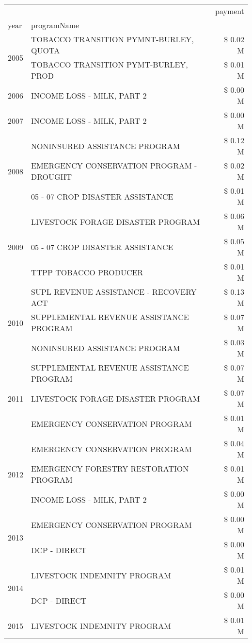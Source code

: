 \begin{tabular}{llr}
\toprule
 &  & payment \\
year & programName &  \\
\midrule
\multirow[t]{2}{*}{2005} & TOBACCO TRANSITION PYMNT-BURLEY, QUOTA & \$ 0.02 M \\
 & TOBACCO TRANSITION PYMT-BURLEY, PROD & \$ 0.01 M \\
\cline{1-3}
2006 & INCOME LOSS - MILK, PART 2 & \$ 0.00 M \\
\cline{1-3}
2007 & INCOME LOSS - MILK, PART 2 & \$ 0.00 M \\
\cline{1-3}
\multirow[t]{3}{*}{2008} & NONINSURED ASSISTANCE PROGRAM & \$ 0.12 M \\
 & EMERGENCY CONSERVATION PROGRAM - DROUGHT & \$ 0.02 M \\
 & 05 - 07 CROP DISASTER ASSISTANCE & \$ 0.01 M \\
\cline{1-3}
\multirow[t]{3}{*}{2009} & LIVESTOCK FORAGE DISASTER  PROGRAM & \$ 0.06 M \\
 & 05 - 07 CROP DISASTER ASSISTANCE & \$ 0.05 M \\
 & TTPP TOBACCO PRODUCER & \$ 0.01 M \\
\cline{1-3}
\multirow[t]{3}{*}{2010} & SUPL REVENUE ASSISTANCE - RECOVERY ACT & \$ 0.13 M \\
 & SUPPLEMENTAL REVENUE ASSISTANCE PROGRAM & \$ 0.07 M \\
 & NONINSURED ASSISTANCE PROGRAM & \$ 0.03 M \\
\cline{1-3}
\multirow[t]{3}{*}{2011} & SUPPLEMENTAL REVENUE ASSISTANCE PROGRAM & \$ 0.07 M \\
 & LIVESTOCK FORAGE DISASTER PROGRAM & \$ 0.07 M \\
 & EMERGENCY CONSERVATION PROGRAM & \$ 0.01 M \\
\cline{1-3}
\multirow[t]{3}{*}{2012} & EMERGENCY CONSERVATION PROGRAM & \$ 0.04 M \\
 & EMERGENCY FORESTRY RESTORATION PROGRAM & \$ 0.01 M \\
 & INCOME LOSS - MILK, PART 2 & \$ 0.00 M \\
\cline{1-3}
\multirow[t]{2}{*}{2013} & EMERGENCY CONSERVATION PROGRAM & \$ 0.00 M \\
 & DCP - DIRECT & \$ 0.00 M \\
\cline{1-3}
\multirow[t]{2}{*}{2014} & LIVESTOCK INDEMNITY PROGRAM & \$ 0.01 M \\
 & DCP - DIRECT & \$ 0.00 M \\
\cline{1-3}
\multirow[t]{3}{*}{2015} & LIVESTOCK INDEMNITY PROGRAM & \$ 0.01 M \\

\end{tabular}
